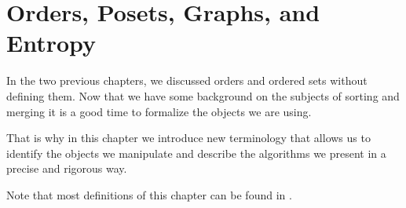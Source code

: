 \chapter{Orders, Posets, Graphs, and Entropy}

In the two previous chapters, we discussed orders and ordered sets without
defining them. Now that we have some background on the subjects of
sorting and merging it is a good time to formalize the objects we are using.

That is why in this chapter we introduce new terminology that allows
us to identify the objects we manipulate and describe the algorithms we present
in a precise and rigorous way.

Note that most definitions of this chapter can be found in
\citet*{Stanley:2011:ECV:2124415}.
